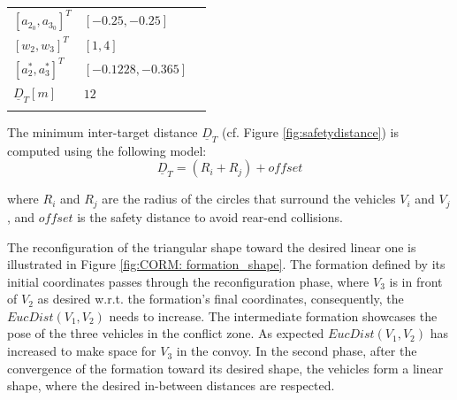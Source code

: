 \begin{enumerate}
\begin{table}[]
\begin{center}
\begin{tabular}{lll}
\multicolumn{1}{|l|}{$[a_{2_{0}}, a_{3_{0}}]^T$}                & \multicolumn{1}{l|}{$[-0.25, -0.25]$}                                                                                                                  &  \\ \cline{1-2}
\multicolumn{1}{|l|}{$[w_2, w_3]^T$}                  & \multicolumn{1}{l|}{$[1, 4]$}                                                                                                                          &  \\ \cline{1-2}
\multicolumn{1}{|l|}{$[a_{2}^*, a_{3}^*]^T$}                    & \multicolumn{1}{l|}{$[-0.1228, -0.365]$}                                                                                                               &  \\ \cline{1-2}
\multicolumn{1}{|l|}{$\underline{D}_T[m]$}                      & \multicolumn{1}{l|}{$12$}                                                                                                                                &  \\ \cline{1-2}
                                                                &                                                                                                                                                          & 
\end{tabular}
\end{center}
\vspace{-10mm}%
\end{table}


    

    The minimum inter-target distance $\underline{D}_T$ (cf. Figure \ref{fig:safetydistance}) is computed using the following model: 
    \begin{equation} \label{eq:minimum_distance_model}
    \underline{D}_T= (R_i + R_j)  + offset
    \end{equation}

    where $R_i$ and $R_j$ are the radius of the circles that surround the vehicles $V_i$ and $V_j$, and $offset$ is the safety distance to avoid rear-end collisions. 











The reconfiguration of the triangular shape toward the desired linear one is illustrated in Figure \ref{fig:CORM: formation_shape}. The formation defined by its initial coordinates passes through the reconfiguration phase, where $V_3$ is in front of $V_2$ as desired w.r.t. the formation's final coordinates, consequently, the $EucDist(V_1,V_2)$ needs to increase. The intermediate formation showcases the pose of the three vehicles in the conflict zone. As expected $EucDist(V_1,V_2)$ has increased to make space for $V_3$ in the convoy. In the second phase, after the convergence of the formation toward its desired shape, the vehicles form a linear shape, where the desired in-between distances are respected. 


\end{enumerate}

